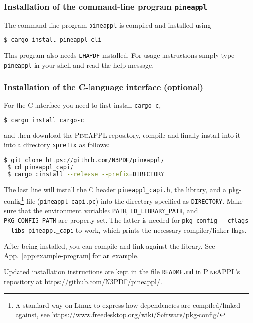 \subsubsection*{Installation of the command-line program \texorpdfstring{\texttt{pineappl}}{pineappl}}

The command-line program \texttt{pineappl} is compiled and installed using
\begin{lstlisting}[language=bash]
 $ cargo install pineappl_cli
\end{lstlisting}
This program also needs \texttt{LHAPDF} \cite{Buckley:2014ana} installed.
For usage instructions simply type \texttt{pineappl} in your shell and read the help message.

\subsubsection*{Installation of the C-language interface (optional)}

For the C interface you need to first install \texttt{cargo-c},
\begin{lstlisting}[language=bash]
 $ cargo install cargo-c
\end{lstlisting}
and then download the \textsc{PineAPPL} repository, compile and finally install into it into a directory \texttt{\$prefix} as follows:
\begin{lstlisting}[language=bash]
 $ git clone https://github.com/N3PDF/pineappl/
 $ cd pineappl_capi/
 $ cargo cinstall --release --prefix=DIRECTORY
\end{lstlisting}
The last line will install the C header \texttt{pineappl\_capi.h}, the library, and a pkg-config\footnote{A standard way on Linux to express how dependencies are compiled/linked against, see \url{https://www.freedesktop.org/wiki/Software/pkg-config/}} file (\texttt{pineappl\_capi.pc}) into the directory specified as \texttt{DIRECTORY}.
Make sure that the environment variables \texttt{PATH}, \texttt{LD\_LIBRARY\_PATH}, and \texttt{PKG\_CONFIG\_PATH} are properly set.
The latter is needed for \texttt{pkg-config -{}-cflags -{}-libs pineappl\_capi} to work, which prints the necessary compiler/linker flags.

After being installed, you can compile and link against the library.
See App.~\ref{app:example-program} for an example.

Updated installation instructions are kept in the file \texttt{README.md} in \textsc{PineAPPL}'s repository at \url{https://github.com/N3PDF/pineappl/}.

